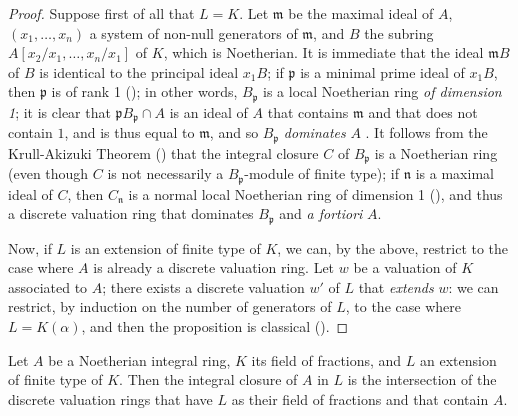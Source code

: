 \begin{proof}
Suppose first of all that $L=K$.
Let $\mathfrak{m}$ be the maximal ideal of $A$, $(x_1,\ldots,x_n)$ a system of non-null generators of $\mathfrak{m}$, and $B$ the subring $A[x_2/x_1,\ldots,x_n/x_1]$ of $K$, which is Noetherian.
It is immediate that the ideal $\mathfrak{m}B$ of $B$ is identical to the principal ideal $x_1B$;
if $\mathfrak{p}$ is a minimal prime ideal of $x_1B$, then $\mathfrak{p}$ is of rank 1 (\cite[t.~I, p.~277]{I-13});
in other words, $B_\mathfrak{p}$ is a local Noetherian ring \emph{of dimension 1};
it is clear that $\mathfrak{p}B_\mathfrak{p}\cap A$ is an ideal of $A$ that contains $\mathfrak{m}$ and that does not contain $1$, and is thus equal to $\mathfrak{m}$, and so $B_\mathfrak{p}$ \emph{dominates} $A$ .
It follows from the Krull-Akizuki Theorem (\cite[p.~293]{II-25}) that the integral closure $C$ of $B_\mathfrak{p}$ is a Noetherian ring (even though $C$ is not necessarily a $B_\mathfrak{p}$-module of finite type);
if $\mathfrak{n}$ is a maximal ideal of $C$, then $C_\mathfrak{n}$ is a normal local Noetherian ring of dimension 1 (\cite[p.~295]{II-25}), and thus a discrete valuation ring that dominates $B_\mathfrak{p}$ and \emph{a fortiori} $A$.

Now, if $L$ is an extension of finite type of $K$, we can, by the above, restrict to the case where $A$ is already a discrete valuation ring.
Let $w$ be a valuation of $K$ associated to $A$;
there exists a discrete valuation $w'$ of $L$ that \emph{extends} $w$: we can restrict, by induction on the number of generators of $L$, to the case where $L=K(\alpha)$, and then the proposition is classical (\cite[p.~106]{II-24}).
\end{proof}

\begin{corollary}[7.1.8]
\label{II.7.1.8}
Let $A$ be a Noetherian integral ring, $K$ its field of fractions, and $L$ an extension of finite type of $K$.
Then the integral closure of $A$ in $L$ is the intersection of the discrete valuation rings that have $L$ as their field of fractions and that contain $A$.
\end{corollary}

